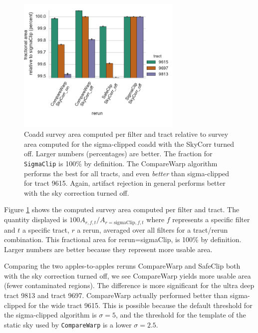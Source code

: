 \documentclass[DM,authoryear,toc]{lsstdoc}
\begin{document}
\begin{figure}
\begin{centering}
\includegraphics[width=0.7\textwidth]{figures/survey_area.pdf}
\par\end{centering}
\caption{\label{fig:area} Coadd survey area computed per filter and tract relative to survey area computed for the sigma-clipped coadd with the SkyCorr turned off.  Larger numbers (percentages) are better.  The fraction for \texttt{SigmaClip} is 100\% by definition. The CompareWarp algorithm performs the best for all tracts, and even \emph{better} than sigma-clipped for tract 9615.  Again, artifact rejection in general performs better with the sky correction turned off. }
\end{figure}

Figure \ref{fig:area} shows the computed survey area computed per filter and tract.
The quantity displayed is $100A_{r,f,t}/A_{r=\mathrm{sigmaClip}, f,t}$ where $f$ represents a specific filter and $t$ a specific tract, $r$ a rerun, averaged over all filters for a tract/rerun combination.  This fractional area for rerun=sigmaClip, is 100\% by definition. Larger numbers are better because they represent more usable area.

Comparing the two apples-to-apples reruns CompareWarp and SafeClip both with the sky correction turned off, we see CompareWarp yields more usable area (fewer contaminated regions).
The difference is more significant for the ultra deep tract 9813 and tract 9697.
CompareWarp actually performed better than sigma-clipped for the wide tract 9615.
This is possible because the default threshold for the sigma-clipped algorithm is $\sigma=5$, and the threshold for the template of the static sky used by \texttt{CompareWarp} is a lower $\sigma=2.5$.
\end{document}
